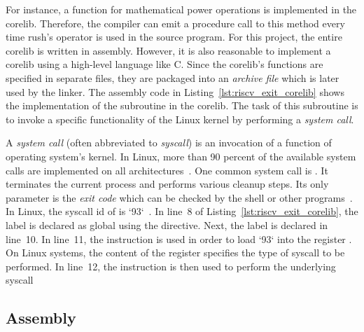 For instance, a function for mathematical power operations is implemented in the corelib.
Therefore, the compiler can emit a procedure call to this method every time rush's \qVerb{**} operator is used in the source program.
For this project, the entire corelib is written in \riscv{} assembly.
However, it is also reasonable to implement a corelib using a high-level language like C.
Since the corelib's functions are specified in separate files, they are packaged into an \emph{archive file} which is later used by the linker.
The assembly code in Listing~\ref{lst:riscv_exit_corelib} shows the implementation of the  subroutine in the \riscv{} corelib.
The task of this subroutine is to invoke a specific functionality of the Linux kernel by performing a \emph{system call}.


A \emph{system call} (often abbreviated to \emph{syscall}) is an invocation of a function of operating system's kernel.
In Linux, more than 90 percent of the available system calls are implemented on all architectures~\cite[p.~3]{Love2013}.
One common system call is .
It terminates the current process and performs various cleanup steps.
Its only parameter is the \emph{exit code} which can be checked by the shell or other programs~\cite[p.~148]{Love2013}.
In \riscv{} Linux, the syscall id of  is `93`~\cite{Torvalds1991}.
In line~8 of Listing~\ref{lst:riscv_exit_corelib}, the  label is declared as global using the  directive.
Next, the  label is declared in line~10.
In line~11, the  instruction is used in order to load `93` into the register .
On \riscv{} Linux systems, the content of the  register specifies the type of syscall to be performed.
In line~12, the  instruction is then used to perform the underlying syscall~\cite[p.~23]{Patterson2017}

\subsection{\riscv{} Assembly}


